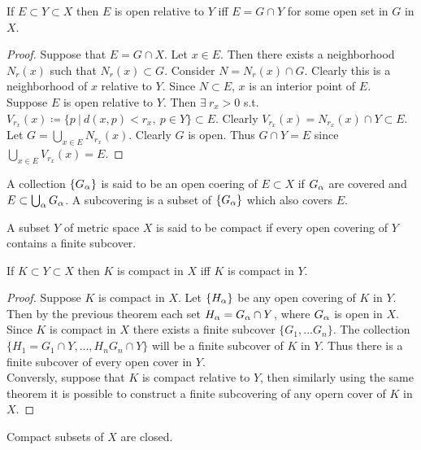 \begin{proposition}
  If $E\subset Y\subset X$ then $E$ is open relative to $Y$ iff $E = G\cap Y$ for some open set in $G$ in $X$.
\end{proposition}
\begin{proof}
  Suppose that $E = G\cap X$. Let $x\in E$. Then there exists a neighborhood $N_r(x)$ such that $N_r(x)\subset G$. Consider $N = N_r(x)\cap G$. Clearly this is a neighborhood of $x$ relative to $Y$. Since $N\subset E$, $x$ is an interior point of $E$.\\

  Suppose $E$ is open relative to $Y$. Then $\exists\ r_x>0$ s.t. $V_{r_x}(x) \coloneqq \{p\ |\ d(x,p)<r_x,\ p \in Y\} \subset E$. Clearly $V_{r_x}(x) = N_{r_x}(x) \cap Y\subset E$. Let $G = \bigcup_{x\in E} N_{r_x}(x)$. Clearly $G$ is open. Thus $G\cap Y = E$ since $\bigcup_{x\in E} V_{r_x}(x) = E$.
\end{proof}
\begin{definition}
  A collection $\{G_\alpha\}$ is said to be an open coering of $E\subset X$ if $G_\alpha$ are covered and $E\subset \bigcup_{\alpha} G_\alpha$. A subcovering is a subset of $\{G_\alpha\}$ which also covers $E$. 
\end{definition}
\begin{definition}
  A subset $Y$ of metric space $X$ is said to be compact if every open covering of $Y$ contains a finite subcover.
\end{definition}
\begin{proposition}
  If $K\subset Y\subset X$ then $K$ is compact in $X$ iff $K$ is compact in $Y$.
\end{proposition}
\begin{proof}
  Suppose $K$ is compact in $X$. Let $\{H_\alpha\}$ be any open covering of $K$ in $Y$. Then by the previous theorem each set $H_\alpha = G_\alpha \cap Y$, where $G_\alpha$ is open in $X$. Since $K$ is compact in $X$ there exists a finite subcover $\{G_1,...G_n\}$. The collection $\{H_1=G_1\cap Y, ..., H_n G_n\cap Y\}$ will be a finite subcover of $K$ in $Y$. Thus there is a finite subcover of every open cover in $Y$.\\

  Conversly, suppose that $K$ is compact relative to $Y$, then similarly using the same theorem it is possible to construct a finite subcovering of any opern cover of $K$ in $X$.
\end{proof}
\begin{proposition}
  Compact subsets of $X$ are closed. 
\end{proposition}
